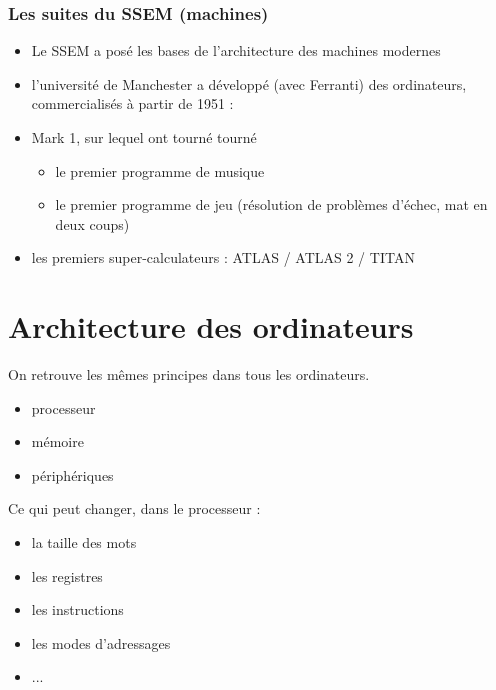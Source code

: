 \documentclass{beamer}
\begin{document}
  \begin{frame}


\frametitle{Les suites du SSEM (machines)}

\begin{itemize}
\item
Le SSEM a posé les bases de l'architecture des machines modernes 


\item l'université de Manchester a développé (avec Ferranti) des
  ordinateurs, commercialisés à partir de 1951 :
\item Mark 1, sur lequel ont tourné
  tourné
\begin{itemize}
\item le premier programme de musique
\item le premier programme de jeu (résolution de problèmes d'échec,
  mat en deux coups)
\end{itemize}
\item les premiers super-calculateurs : ATLAS / ATLAS 2 / TITAN 
\end{itemize}
\end{frame}

\section{Architecture des ordinateurs}
\begin{frame}
On retrouve les mêmes principes dans tous les ordinateurs.
\begin{itemize}
\item processeur
\item mémoire
\item périphériques
\end{itemize}

Ce qui peut changer, dans le processeur :
\begin{itemize}
\item la taille des mots
\item les registres
\item les instructions
\item les modes d'adressages
\item ...
\end{itemize}
\end{frame}
\end{document}
